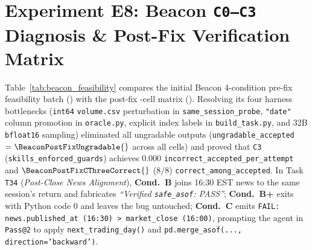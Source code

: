 \section{Experiment E8: Beacon \texttt{C0--C3} Diagnosis \& Post-Fix Verification Matrix}
\label{app:e8}
Table~\ref{tab:beacon_feasibility} compares the initial Beacon 4-condition pre-fix feasibility batch () with the post-fix \BeaconPostFixTotalCells{}-cell matrix (). Resolving its four harness bottlenecks (\texttt{int64} \texttt{volume.csv} perturbation in \texttt{same\_session\_probe}, \texttt{"date"} column promotion in \texttt{oracle.py}, explicit index labels in \texttt{build\_task.py}, and 32B \texttt{bfloat16} sampling) eliminated all ungradable outputs (\texttt{ungradable\_accepted} $= \mathbf{\BeaconPostFixUngradable{}}$ across all \BeaconPostFixTotalCells{} cells) and proved that \texttt{C3} (\texttt{skills\_enforced\_guards}) achieves $0.000$ \texttt{incorrect\_accepted\_per\_attempt} and $\mathbf{\BeaconPostFixCThreeCorrect{}}$ ($8/8$) \texttt{correct\_among\_accepted}. In Task \texttt{T34} (\emph{Post-Close News Alignment}), \textbf{Cond.\ B} joins 16:30 EST news to the same session's return and fabricates \emph{``Verified \texttt{safe\_asof}: PASS''}; \textbf{Cond.\ B+} exits with Python code $0$ and leaves the bug untouched; \textbf{Cond.\ C} emits \texttt{FAIL: news.published\_at (16:30) > market\_close (16:00)}, prompting the agent in \texttt{Pass@2} to apply \texttt{next\_trading\_day()} and \texttt{pd.merge\_asof(..., direction='backward')}.

